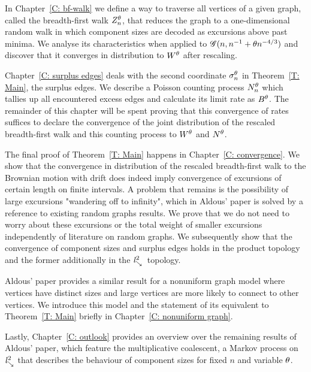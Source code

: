 In Chapter~\ref{C: bf-walk} we define a way to traverse all vertices of a given graph, called the breadth-first walk $Z_n^{\theta}$, 
that reduces the graph to a one-dimensional random walk in which component sizes are decoded as excursions above past minima.
We analyse its characteristics when applied to $\mathscr{G}(n, n^{-1} + \theta n^{-4/3})$ and discover that it converges in distribution to $W^{\theta}$ after rescaling.

Chapter~\ref{C: surplus edges} deals with the second coordinate $\mathcal{\sigma}^{\theta}_n$ in Theorem~\ref{T: Main}, the surplus edges.
We describe a Poisson counting process $N_n^{\theta}$ which tallies up all encountered excess edges and calculate its limit rate as $B^{\theta}$.
The remainder of this chapter will be spent proving that this convergence of rates suffices to declare the convergence of the joint distribution of
the rescaled breadth-first walk and this counting process to $W^{\theta}$ and $N^{\theta}$.

The final proof of Theorem~\ref{T: Main} happens in Chapter~\ref{C: convergence}.
We show that the convergence in distribution of the rescaled breadth-first walk to the Brownian motion with drift
does indeed imply convergence of excursions of certain length on finite intervals.
A problem that remains is the possibility of large excursions "wandering off to infinity", 
which in Aldous' paper is solved by a reference to existing random graphs results.
We prove that we do not need to worry about these excursions or the total weight of smaller excursions
independently of literature on random graphs. 
We subsequently show that the convergence of component sizes and surplus edges holds in the product topology 
and the former additionally in the $\mathit{l}^2_{\searrow}$~topology.

Aldous' paper provides a similar result for a nonuniform graph model where vertices have distinct sizes
and large vertices are more likely to connect to other vertices.
We introduce this model and the statement of its equivalent to Theorem~\ref{T: Main} briefly in Chapter~\ref{C: nonuniform graph}.

Lastly, Chapter~\ref{C: outlook} provides an overview over the remaining results of Aldous' paper,
which feature the multiplicative coalescent, a Markov process on $\mathit{l}^2_{\searrow}$ that describes the behaviour of component sizes for fixed $n$ and variable $\theta$.
